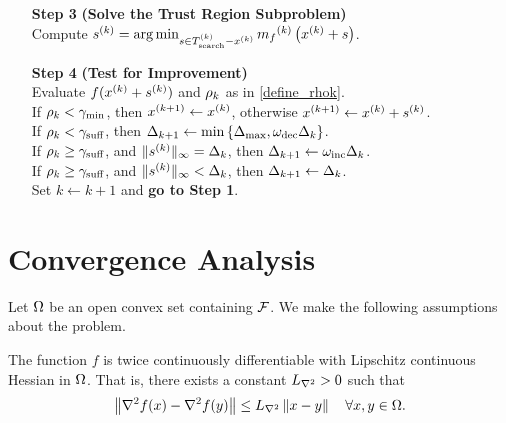 \documentclass{article}
\begin{document}
{\begin{fullwidth}[leftmargin=0in, rightmargin=0in, width=\linewidth-0.5in]
\begin{flushleft}
\begin{algorithm}[H]
\begin{itemize}
        
        \item[\textbf{Step 3}] \textbf{(Solve the Trust Region Subproblem)} \\
            Compute ${{s}^{(k)}} = \operatorname*{arg\,min}_{s \in {T_{\text{search}}^{(k)}} - x^{(k)}} {{m}_f}^{(k)}\left(x^{(k)} + s\right)$. 
            
 		
        \item[\textbf{Step 4}] \textbf{(Test for Improvement)} \\
            Evaluate $f(x^{(k)} + {{s}^{(k)}})$ and $\rho_k$ as in \cref{define_rhok}. \\
		   If $\rho_k < \gamma_{\textrm{min}}$, then ${{x}^{(k+1)}} \gets x^{(k)}$, otherwise ${{x}^{(k+1)}} \gets x^{(k)} + {{s}^{(k)}}$. \\
            If $\rho_k < \gamma_{\textrm{suff}}$, then $\Delta_{k+1} \gets \min\left\{{\Delta_{\textrm{max}}}, \omega_{\text{dec}}\Delta_k\right\}$. \\
            If $\rho_k \ge \gamma_{\textrm{suff}}$, and $\|{{s}^{(k)}}\|_{\infty} = \Delta_k$, then $\Delta_{k+1} \gets \omega_{\text{inc}}\Delta_k$. \\
            If $\rho_k \ge \gamma_{\textrm{suff}}$, and $\|{{s}^{(k)}}\|_{\infty} < \Delta_k$, then $\Delta_{k+1} \gets \Delta_k$. \\
            Set $k \gets k+1$ and {\bf go to Step 1}.
    \end{itemize}
\end{algorithm}

\end{flushleft}
\end{fullwidth}
}
 
 
\section{Convergence Analysis}
\label{linear_convergence_discussion} 

Let $\Omega$ be an open convex set containing ${\mathcal F}$. 
We make the following assumptions about the problem.


\begin{assumption}
\label{for_fully_quadratic}
\label{lipschitz_hessian}
The function $f$ is twice continuously differentiable with Lipschitz continuous Hessian in $\Omega$.   That is, there exists a constant ${L_{\nabla^2}} > 0$ such that 
\begin{align}
\left\|\nabla^2 f(x) - \nabla^2 f(y)\right\| \le {L_{\nabla^2}} \left\|x - y\right\| \quad \forall x, y \in \Omega.
\end{align}
\end{assumption}
\end{document}

